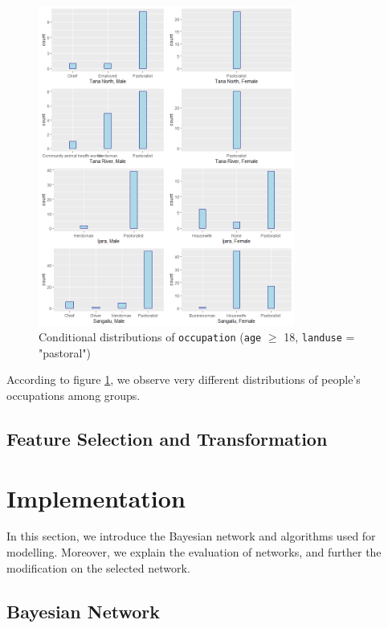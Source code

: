 \documentclass[11pt,twoside]{article}
\numberwithin{Theorem}{section}
\numberwithin{Definition}{section}
\numberwithin{Lemma}{section}
\numberwithin{Algorithm}{section}
\numberwithin{equation}{section}
\begin{document}
\begin{figure}[!h]
	\centering
	\includegraphics[width = 0.75\textwidth]{Images/occupation_gender_constituency.png}
	\caption{Conditional distributions of \texttt{occupation} (\texttt{age} $\geq$ 18, \texttt{landuse} = "pastoral")}
	\label{fig:occ4}		
\end{figure} 

According to figure \ref{fig:occ4}, we observe very different distributions of people's occupations among groups. 

\subsection{Feature Selection and Transformation}


\clearpage

\section{Implementation}
\label{sec:implementation}

In this section, we introduce the Bayesian network and algorithms used for modelling. Moreover, we explain the evaluation of networks, and further the modification on the selected network.

\subsection{Bayesian Network}
\end{document}
